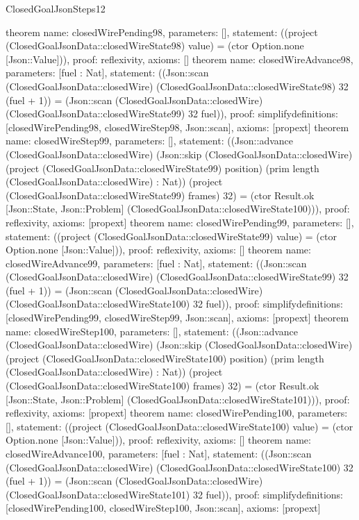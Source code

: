 \begin{lexlean}{ClosedGoalJsonSteps12}
\begin{semanticmodule}
{}
theorem{
 name: closedWirePending98, parameters: [],
 statement: ((project (ClosedGoalJsonData::closedWireState98) value) = (ctor Option.none [Json::Value])), proof: reflexivity{}, axioms: []
}
theorem{
 name: closedWireAdvance98, parameters: [fuel : Nat],
 statement: ((Json::scan (ClosedGoalJsonData::closedWire) (ClosedGoalJsonData::closedWireState98) 32 (fuel + 1)) = (Json::scan (ClosedGoalJsonData::closedWire) (ClosedGoalJsonData::closedWireState99) 32 fuel)), proof: simplify{definitions: [closedWirePending98, closedWireStep98, Json::scan]}, axioms: [propext]
}
theorem{
 name: closedWireStep99, parameters: [],
 statement: ((Json::advance (ClosedGoalJsonData::closedWire) (Json::skip (ClosedGoalJsonData::closedWire) (project (ClosedGoalJsonData::closedWireState99) position) (prim length (ClosedGoalJsonData::closedWire) : Nat)) (project (ClosedGoalJsonData::closedWireState99) frames) 32) = (ctor Result.ok [Json::State, Json::Problem] (ClosedGoalJsonData::closedWireState100))), proof: reflexivity{}, axioms: [propext]
}
theorem{
 name: closedWirePending99, parameters: [],
 statement: ((project (ClosedGoalJsonData::closedWireState99) value) = (ctor Option.none [Json::Value])), proof: reflexivity{}, axioms: []
}
theorem{
 name: closedWireAdvance99, parameters: [fuel : Nat],
 statement: ((Json::scan (ClosedGoalJsonData::closedWire) (ClosedGoalJsonData::closedWireState99) 32 (fuel + 1)) = (Json::scan (ClosedGoalJsonData::closedWire) (ClosedGoalJsonData::closedWireState100) 32 fuel)), proof: simplify{definitions: [closedWirePending99, closedWireStep99, Json::scan]}, axioms: [propext]
}
theorem{
 name: closedWireStep100, parameters: [],
 statement: ((Json::advance (ClosedGoalJsonData::closedWire) (Json::skip (ClosedGoalJsonData::closedWire) (project (ClosedGoalJsonData::closedWireState100) position) (prim length (ClosedGoalJsonData::closedWire) : Nat)) (project (ClosedGoalJsonData::closedWireState100) frames) 32) = (ctor Result.ok [Json::State, Json::Problem] (ClosedGoalJsonData::closedWireState101))), proof: reflexivity{}, axioms: [propext]
}
theorem{
 name: closedWirePending100, parameters: [],
 statement: ((project (ClosedGoalJsonData::closedWireState100) value) = (ctor Option.none [Json::Value])), proof: reflexivity{}, axioms: []
}
theorem{
 name: closedWireAdvance100, parameters: [fuel : Nat],
 statement: ((Json::scan (ClosedGoalJsonData::closedWire) (ClosedGoalJsonData::closedWireState100) 32 (fuel + 1)) = (Json::scan (ClosedGoalJsonData::closedWire) (ClosedGoalJsonData::closedWireState101) 32 fuel)), proof: simplify{definitions: [closedWirePending100, closedWireStep100, Json::scan]}, axioms: [propext]
}
\end{semanticmodule}
\end{lexlean}
